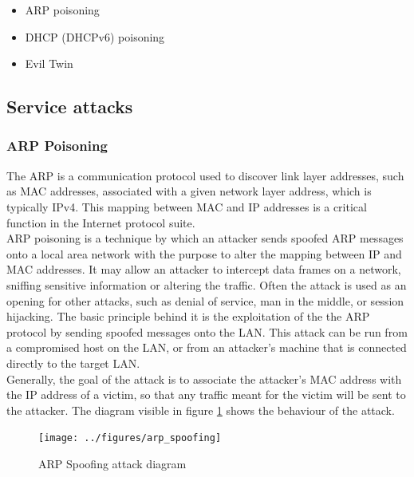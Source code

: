 \documentclass[final]{article}
\begin{document}
\begin{itemize}
  \item ARP poisoning
  \item DHCP (DHCPv6) poisoning
  \item Evil Twin
\end{itemize}

\subsection{Service attacks}
\subsubsection{ARP Poisoning}
The \ac{ARP} is a communication protocol used to discover link layer addresses,
such as MAC addresses, associated with a given network layer address, which is typically IPv4.
This mapping between MAC and IP addresses is a critical function in the Internet protocol suite. \\
\ac{ARP} poisoning is a technique by which an attacker sends spoofed \ac{ARP} messages
onto a local area network with the purpose to alter the mapping between IP and MAC addresses.
It may allow an attacker to intercept data frames on a network, sniffing sensitive information or altering the traffic.
Often the attack is used as an opening for other attacks,
such as denial of service, man in the middle, or session hijacking.
The basic principle behind it is the exploitation of the the
\ac{ARP} protocol by sending spoofed messages onto the LAN.
This attack can be run from a compromised host on the LAN,
or from an attacker's machine that is connected directly to the target LAN.\\
Generally, the goal of the attack is to associate the attacker's MAC address
with the IP address of a victim, so that any traffic meant for the victim
will be sent to the attacker.
The diagram visible in figure \ref{arp_spoofing} shows the behaviour of the attack.
\begin{figure}
  \center
  \texttt{[image: ../figures/arp\_spoofing]}
  \caption{ARP Spoofing attack diagram}
  \label{arp_spoofing}
\end{figure}
\end{document}
